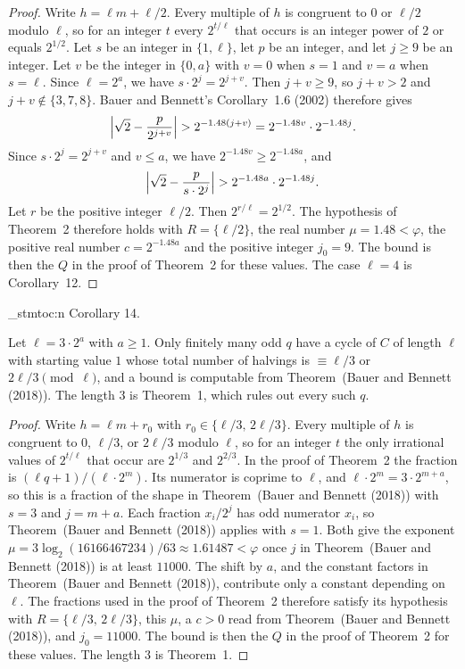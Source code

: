 \documentclass[11pt]{article}
\newenvironment{named}[1]{%
  \par\addvspace{\medskipamount}%
  \pagebreak[3]%
  \noindent{\bfseries #1}\space\ignorespaces
  \stmtoc{#1}%
}{\par\addvspace{\medskipamount}}
\newcommand{\stmtoc}[1]{ \qn_stmtoc:n {#1} }
\begin{document}
\begin{proof}
Write $h = \ell m + \ell/2$.
Every multiple of $h$ is congruent to $0$ or $\ell/2$ modulo $\ell$, so for an integer $t$ every $2^{t/\ell}$ that occurs is an integer power of $2$ or equals $2^{1/2}$.
Let $s$ be an integer in $\{1, \ell\}$, let $p$ be an integer, and let $j \ge 9$ be an integer.
Let $v$ be the integer in $\{0, a\}$ with $v = 0$ when $s = 1$ and $v = a$ when $s = \ell$.
Since $\ell = 2^a$, we have $s \cdot 2^j = 2^{j+v}$.
Then $j+v \ge 9$, so $j+v > 2$ and $j+v \notin \{3, 7, 8\}$.
Bauer and Bennett's Corollary~1.6 (2002) therefore gives
\[
\Bigl|\sqrt{2} - \frac{p}{2^{j+v}}\Bigr| > 2^{-1.48(j+v)} = 2^{-1.48 v} \cdot 2^{-1.48 j}.
\]
Since $s \cdot 2^j = 2^{j+v}$ and $v \le a$, we have $2^{-1.48 v} \ge 2^{-1.48 a}$, and
\[
\Bigl|\sqrt{2} - \frac{p}{s \cdot 2^j}\Bigr| > 2^{-1.48 a} \cdot 2^{-1.48 j}.
\]
Let $r$ be the positive integer $\ell/2$. Then $2^{r/\ell} = 2^{1/2}$.
The hypothesis of Theorem~2 therefore holds with $R = \{\ell/2\}$, the real number $\mu = 1.48 < \varphi$, the positive real number $c = 2^{-1.48 a}$ and the positive integer $j_0 = 9$.
The bound is then the $Q$ in the proof of Theorem~2 for these values.
The case $\ell = 4$ is Corollary~12.
\end{proof}

\begin{named}{Corollary 14.}
Let $\ell = 3 \cdot 2^a$ with $a \ge 1$.
Only finitely many odd $q$ have a cycle of $C$ of length $\ell$ with starting value $1$ whose total number of halvings is $\equiv \ell/3$ or $2\ell/3 \pmod{\ell}$, and a bound is computable from Theorem~(Bauer and Bennett (2018)).
The length $3$ is Theorem~1, which rules out every such $q$.
\end{named}

\begin{proof}
Write $h = \ell m + r_0$ with $r_0 \in \{\ell/3,\, 2\ell/3\}$.
Every multiple of $h$ is congruent to $0$, $\ell/3$, or $2\ell/3$ modulo $\ell$, so for an integer $t$ the only irrational values of $2^{t/\ell}$ that occur are $2^{1/3}$ and $2^{2/3}$.
In the proof of Theorem~2 the fraction is $(\ell q + 1)/(\ell \cdot 2^m)$.
Its numerator is coprime to $\ell$, and $\ell \cdot 2^m = 3 \cdot 2^{m+a}$, so this is a fraction of the shape in Theorem~(Bauer and Bennett (2018)) with $s = 3$ and $j = m+a$.
Each fraction $x_i/2^j$ has odd numerator $x_i$, so Theorem~(Bauer and Bennett (2018)) applies with $s = 1$.
Both give the exponent $\mu = 3\log_2(16166467234)/63 \approx 1.61487 < \varphi$ once $j$ in Theorem~(Bauer and Bennett (2018)) is at least $11000$.
The shift by $a$, and the constant factors in Theorem~(Bauer and Bennett (2018)), contribute only a constant depending on $\ell$.
The fractions used in the proof of Theorem~2 therefore satisfy its hypothesis with $R = \{\ell/3,\, 2\ell/3\}$, this $\mu$, a $c > 0$ read from Theorem~(Bauer and Bennett (2018)), and $j_0 = 11000$.
The bound is then the $Q$ in the proof of Theorem~2 for these values.
The length $3$ is Theorem~1.
\end{proof}
\end{document}
